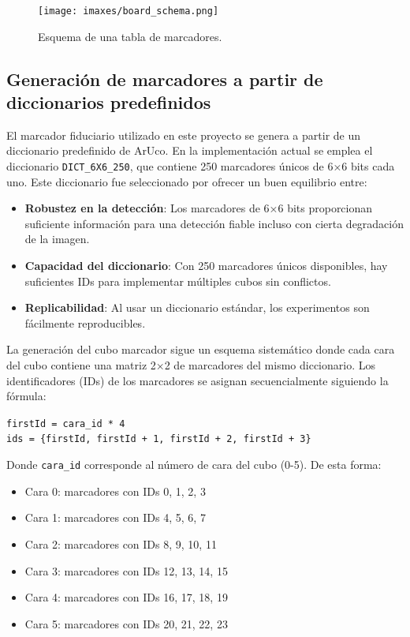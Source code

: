 \begin{figure}
	\centering
	\texttt{[image: imaxes/board\_schema.png]}
	\caption{Esquema de una tabla de marcadores.}
	\label{fig:board_schema}
\end{figure}

\subsection{Generación de marcadores a partir de diccionarios predefinidos}
El marcador fiduciario utilizado en este proyecto se genera a partir de un diccionario predefinido de ArUco. En la implementación actual se emplea el diccionario \texttt{DICT\_6X6\_250}, que contiene 250 marcadores únicos de 6×6 bits cada uno. Este diccionario fue seleccionado por ofrecer un buen equilibrio entre:

\begin{itemize}
    \item \textbf{Robustez en la detección}: Los marcadores de 6×6 bits proporcionan suficiente información para una detección fiable incluso con cierta degradación de la imagen.
    \item \textbf{Capacidad del diccionario}: Con 250 marcadores únicos disponibles, hay suficientes IDs para implementar múltiples cubos sin conflictos.
    \item \textbf{Replicabilidad}: Al usar un diccionario estándar, los experimentos son fácilmente reproducibles.
\end{itemize}

La generación del cubo marcador sigue un esquema sistemático donde cada cara del cubo contiene una matriz 2×2 de marcadores del mismo diccionario. Los identificadores (IDs) de los marcadores se asignan secuencialmente siguiendo la fórmula:

\begin{center}
\texttt{firstId = cara\_id * 4}\\
\texttt{ids = \{firstId, firstId + 1, firstId + 2, firstId + 3\}}
\end{center}

Donde \texttt{cara\_id} corresponde al número de cara del cubo (0-5). De esta forma:
\begin{itemize}
	\item Cara 0: marcadores con IDs 0, 1, 2, 3
	\item Cara 1: marcadores con IDs 4, 5, 6, 7
	\item Cara 2: marcadores con IDs 8, 9, 10, 11
	\item Cara 3: marcadores con IDs 12, 13, 14, 15
	\item Cara 4: marcadores con IDs 16, 17, 18, 19
	\item Cara 5: marcadores con IDs 20, 21, 22, 23
\end{itemize}

